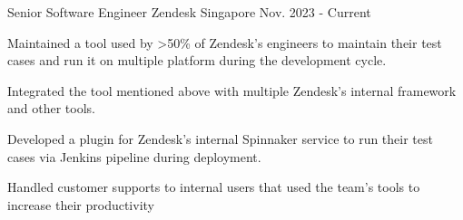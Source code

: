 

\begin{cventries}

  \cventry
    {Senior Software Engineer} %
    {Zendesk} %
    {Singapore} %
    {Nov. 2023 - Current} %
    {
      \begin{cvitems} %
        \item {Maintained a tool used by >50\% of Zendesk's engineers to maintain their test cases and run it on multiple platform during the development cycle.}
        \item {Integrated the tool mentioned above with multiple Zendesk's internal framework and other tools.}
        \item {Developed a plugin for Zendesk's internal Spinnaker service to run their test cases via Jenkins pipeline during deployment.}
        \item {Handled customer supports to internal users that used the team's tools to increase their productivity}
      \end{cvitems}
    }


\end{cventries}
